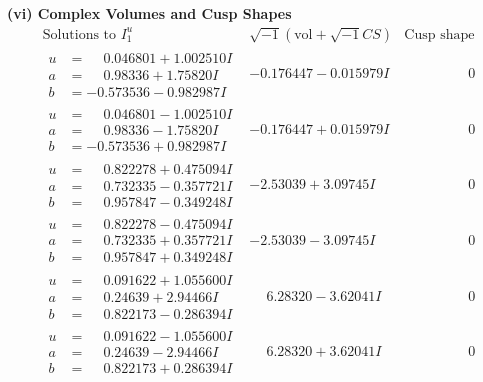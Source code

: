 \documentclass[1p]{elsarticle_modified}
\theoremstyle{definition}
\newcommand{\I}{\sqrt{-1}}
\begin{document}
\newpage\flushleft \textbf{(vi) Complex Volumes and Cusp Shapes}
$$\begin{array}{c|c|c}  
\text{Solutions to }I^u_{1}& \I (\text{vol} + \sqrt{-1}CS) & \text{Cusp shape}\\
 \hline 
\begin{aligned}
u &= \phantom{-}0.046801 + 1.002510 I \\
a &= \phantom{-}0.98336 + 1.75820 I \\
b &= -0.573536 - 0.982987 I\end{aligned}
 & -0.176447 - 0.015979 I & \phantom{-0.000000 } 0 \\ \hline\begin{aligned}
u &= \phantom{-}0.046801 - 1.002510 I \\
a &= \phantom{-}0.98336 - 1.75820 I \\
b &= -0.573536 + 0.982987 I\end{aligned}
 & -0.176447 + 0.015979 I & \phantom{-0.000000 } 0 \\ \hline\begin{aligned}
u &= \phantom{-}0.822278 + 0.475094 I \\
a &= \phantom{-}0.732335 - 0.357721 I \\
b &= \phantom{-}0.957847 - 0.349248 I\end{aligned}
 & -2.53039 + 3.09745 I & \phantom{-0.000000 } 0 \\ \hline\begin{aligned}
u &= \phantom{-}0.822278 - 0.475094 I \\
a &= \phantom{-}0.732335 + 0.357721 I \\
b &= \phantom{-}0.957847 + 0.349248 I\end{aligned}
 & -2.53039 - 3.09745 I & \phantom{-0.000000 } 0 \\ \hline\begin{aligned}
u &= \phantom{-}0.091622 + 1.055600 I \\
a &= \phantom{-}0.24639 + 2.94466 I \\
b &= \phantom{-}0.822173 - 0.286394 I\end{aligned}
 & \phantom{-}6.28320 - 3.62041 I & \phantom{-0.000000 } 0 \\ \hline\begin{aligned}
u &= \phantom{-}0.091622 - 1.055600 I \\
a &= \phantom{-}0.24639 - 2.94466 I \\
b &= \phantom{-}0.822173 + 0.286394 I\end{aligned}
 & \phantom{-}6.28320 + 3.62041 I & \phantom{-0.000000 } 0 \\ \hline\begin{aligned}

\end{aligned}
\end{array}$$
\end{document}

